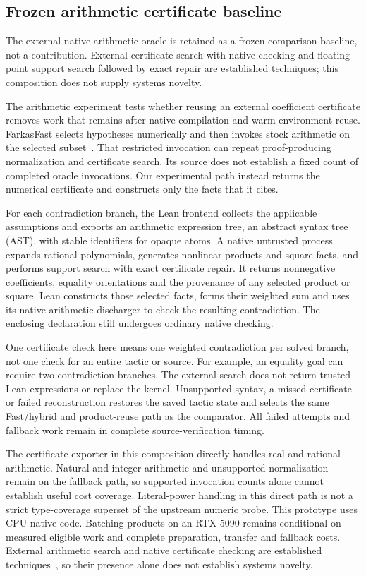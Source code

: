 \documentclass[10pt,twocolumn]{article}
\begin{document}
\subsection{Frozen arithmetic certificate baseline}\label{sec:arithmetic-oracle}
The external native arithmetic oracle is retained as a frozen comparison
baseline, not a contribution. External certificate search with native checking
and floating-point support search followed by exact repair are established
techniques; this composition does not supply systems novelty.

The arithmetic experiment tests whether reusing an external coefficient
certificate removes work that remains after native compilation and warm
environment reuse. FarkasFast selects hypotheses numerically and then invokes
stock arithmetic on the selected subset~\cite{farkasSource}.
That restricted invocation can repeat proof-producing normalization and
certificate search. Its source does not establish a fixed count of completed
oracle invocations. Our experimental path instead returns the numerical
certificate and constructs only the facts that it cites.

For each contradiction branch, the Lean frontend collects the applicable
assumptions and exports an arithmetic expression tree, an abstract syntax tree (AST), with stable identifiers
for opaque atoms. A native untrusted process expands rational polynomials,
generates nonlinear products and square facts, and performs support search
with exact certificate repair. It returns nonnegative coefficients, equality
orientations and the provenance of any selected product or square.
Lean constructs those selected facts, forms their weighted sum and uses its
native arithmetic discharger to check the resulting contradiction.
The enclosing declaration still undergoes ordinary native checking.

One certificate check here means one weighted contradiction per solved branch,
not one check for an entire tactic or source. For example, an equality goal
can require two contradiction branches. The external search does not return
trusted Lean expressions or replace the kernel. Unsupported syntax, a missed
certificate or failed reconstruction restores the saved tactic state and
selects the same Fast/hybrid and product-reuse path as the comparator.
All failed attempts and fallback work remain in complete source-verification timing.

The certificate exporter in this composition directly handles real and rational arithmetic.
Natural and integer arithmetic and unsupported normalization remain on the
fallback path, so supported invocation counts alone cannot establish useful
cost coverage. Literal-power handling in this direct path is not a strict
type-coverage superset of the upstream numeric probe. This prototype uses CPU native code. Batching products on
an RTX 5090 remains conditional on measured eligible work and complete
preparation, transfer and fallback costs. External arithmetic search and
native certificate checking are established techniques~\cite{farkasSource,mathlib},
so their presence alone does not establish systems novelty.
\end{document}
